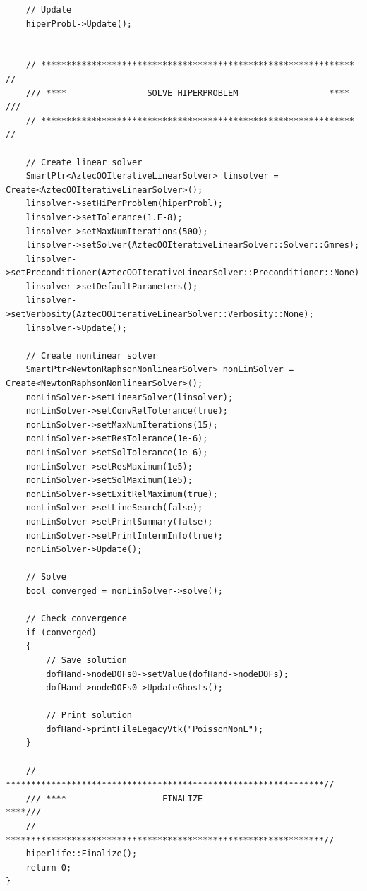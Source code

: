 \documentclass[]{article}
\begin{document}
\begin{lstlisting}
	// Update
	hiperProbl->Update();
		
		
	// ************************************************************** //
	/// ****                SOLVE HIPERPROBLEM                  **** ///
	// ************************************************************** //
		
	// Create linear solver
	SmartPtr<AztecOOIterativeLinearSolver> linsolver = Create<AztecOOIterativeLinearSolver>();
	linsolver->setHiPerProblem(hiperProbl);
	linsolver->setTolerance(1.E-8);
	linsolver->setMaxNumIterations(500);
	linsolver->setSolver(AztecOOIterativeLinearSolver::Solver::Gmres);
	linsolver->setPreconditioner(AztecOOIterativeLinearSolver::Preconditioner::None);
	linsolver->setDefaultParameters();
	linsolver->setVerbosity(AztecOOIterativeLinearSolver::Verbosity::None);
	linsolver->Update();
		
	// Create nonlinear solver
	SmartPtr<NewtonRaphsonNonlinearSolver> nonLinSolver = Create<NewtonRaphsonNonlinearSolver>();
	nonLinSolver->setLinearSolver(linsolver);
	nonLinSolver->setConvRelTolerance(true);
	nonLinSolver->setMaxNumIterations(15);
	nonLinSolver->setResTolerance(1e-6);
	nonLinSolver->setSolTolerance(1e-6);
	nonLinSolver->setResMaximum(1e5);
	nonLinSolver->setSolMaximum(1e5);
	nonLinSolver->setExitRelMaximum(true);
	nonLinSolver->setLineSearch(false);
	nonLinSolver->setPrintSummary(false);
	nonLinSolver->setPrintIntermInfo(true);
	nonLinSolver->Update();
		
	// Solve
	bool converged = nonLinSolver->solve();
		
	// Check convergence
	if (converged)
	{
		// Save solution
		dofHand->nodeDOFs0->setValue(dofHand->nodeDOFs);
		dofHand->nodeDOFs0->UpdateGhosts();
			
		// Print solution
		dofHand->printFileLegacyVtk("PoissonNonL");
	}
		
	// ***************************************************************//
	/// ****                   FINALIZE                          ****///
	// ***************************************************************//
	hiperlife::Finalize();
	return 0;
}
	
\end{lstlisting}
\end{document}
